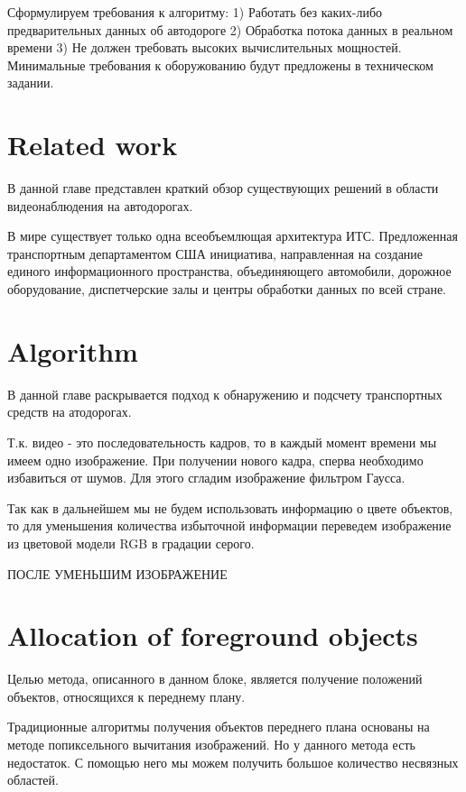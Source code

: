 \documentclass[12pt,a4paper,oneside,titlepage]{article}
\begin{document}
Сформулируем требования к алгоритму:
1) Работать без каких-либо предварительных данных об автодороге
2) Обработка потока данных в реальном времени
3) Не должен требовать высоких вычислительных мощностей. Минимальные требования к оборужованию будут предложены в техническом задании.


\newpage
\section*{Related work}
В данной главе представлен краткий обзор существующих решений в области видеонаблюдения на автодорогах.

В мире существует только одна всеобъемлющая архитектура ИТС. Предложенная транспортным департаментом США инициатива, направленная на создание единого информационного пространства, объединяющего автомобили, дорожное оборудование, диспетчерские залы и центры обработки данных по всей стране. 



\newpage
\section*{Algorithm}
В данной главе раскрывается подход к обнаружению и подсчету транспортных средств на атодорогах.



Т.к. видео - это последовательность кадров, то в каждый момент времени мы имеем одно изображение.
При получении нового кадра, сперва необходимо избавиться от шумов.
Для этого сгладим изображение фильтром Гаусса. %

Так как в дальнейшем мы не будем использовать информацию о цвете объектов, то для уменьшения количества избыточной информации переведем изображение из цветовой модели RGB в градации серого. %

ПОСЛЕ УМЕНЬШИМ ИЗОБРАЖЕНИЕ

\newpage
\section*{Allocation of foreground objects}
Целью метода, описанного в данном блоке, является получение положений объектов, относящихся к переднему плану.

Традиционные алгоритмы получения объектов переднего плана основаны на методе попиксельного вычитания изображений.
Но у данного метода есть недостаток.
С помощью него мы можем получить большое количество несвязных областей. %
\end{document}
